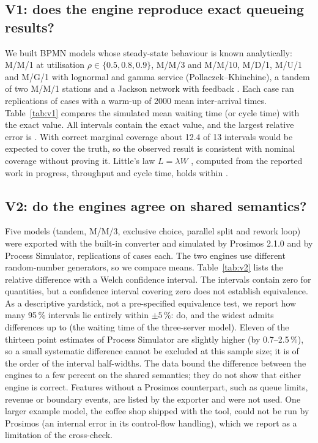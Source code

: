 \documentclass[preprint,12pt,nonatbib]{elsarticle}
\newcommand{\tool}{Process Simulator}
\begin{document}
\subsection{V1: does the engine reproduce exact queueing results?}
\label{sec:v1}
We built BPMN models whose steady-state behaviour is known analytically: M/M/1 at utilisation $\rho\in\{0.5,0.8,0.9\}$, M/M/3 and M/M/10, M/D/1, M/U/1 and M/G/1 with lognormal and gamma service (Pollaczek--Khinchine), a tandem of two M/M/1 stations and a Jackson network with feedback \citep{jackson1957}. Each case ran \VoneReps{} replications of \VoneCases{} cases with a warm-up of 2000 mean inter-arrival times. Table~\ref{tab:v1} compares the simulated mean waiting time (or cycle time) with the exact value. All \VoneCovered{} intervals contain the exact value, and the largest relative error is \VoneWorst. With correct marginal coverage about 12.4 of 13 intervals would be expected to cover the truth, so the observed result is consistent with nominal coverage without proving it. Little's law $L=\lambda W$ \citep{little1961}, computed from the reported work in progress, throughput and cycle time, holds within \VoneLittle.

\begin{table}[t]
\centering\small
\caption{V1: simulated versus exact mean times in seconds; 13 verification quantities across the tested models.}
\label{tab:v1}
\resizebox{\linewidth}{!}{}
\end{table}

\subsection{V2: do the engines agree on shared semantics?}
\label{sec:v2}
Five models (tandem, M/M/3, exclusive choice, parallel split and rework loop) were exported with the built-in converter and simulated by Prosimos 2.1.0 and by \tool{}, \VtwoReps{} replications of \VtwoCases{} cases each. The two engines use different random-number generators, so we compare means. Table~\ref{tab:v2} lists the relative difference with a Welch confidence interval. The intervals contain zero for \VtwoZero{} quantities, but a confidence interval covering zero does not establish equivalence. As a descriptive yardstick, not a pre-specified equivalence test, we report how many 95\,\% intervals lie entirely within $\pm5$\,\%: \VtwoEquiv{} do, and the widest admits differences up to \VtwoBound{} (the waiting time of the three-server model). Eleven of the thirteen point estimates of \tool{} are slightly higher (by 0.7--2.5\,\%), so a small systematic difference cannot be excluded at this sample size; it is of the order of the interval half-widths. The data bound the difference between the engines to a few percent on the shared semantics; they do not show that either engine is correct. Features without a Prosimos counterpart, such as queue limits, revenue or boundary events, are listed by the exporter and were not used. One larger example model, the coffee shop shipped with the tool, could not be run by Prosimos (an internal error in its control-flow handling), which we report as a limitation of the cross-check.
\end{document}
